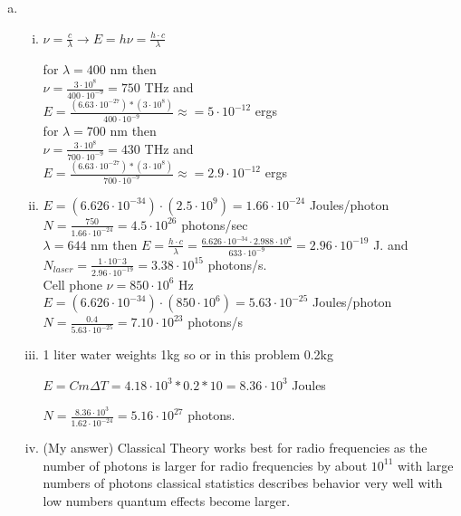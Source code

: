 \documentclass[ps1.tex]{subfiles}
\begin{document}
\noindent\makebox[\linewidth]{\rule{\paperwidth}{0.4pt}}

\begin{enumerate}[(a)]
\item \mbox{} \\ 
\noindent
\begin{enumerate}[i.]
\item $\nu=\frac {c}{\lambda} \rightarrow E = h\nu = \frac{h\cdot c}{\lambda}$

for $\lambda = 400$ nm then \\
$\nu = \frac {3\cdot 10^8}{400\cdot 10^{-9}} = 750$  THz and \\
$E=\frac{(6.63\cdot 10^{-27})*(3\cdot 10^8)}{400\cdot 10^{-9}} \approx = 5\cdot 10^{-12}$ ergs\\

for $\lambda = 700$ nm then \\
$\nu = \frac {3\cdot 10^8}{700\cdot 10^{-9}} = 430$  THz and \\
$E=\frac{(6.63\cdot 10^{-27})*(3\cdot 10^8)}{700\cdot 10^{-9}} \approx = 2.9\cdot 10^{-12}$ ergs

\item $E= (6.626\cdot 10^{-34})\cdot(2.5\cdot10^9) = 1.66\cdot 10^{-24}$ Joules/photon\\
$N = \frac{750}{1.66\cdot 10^{-24}} = 4.5\cdot10^{26}$ photons/sec\\

$\lambda = 644$ nm then $E= \frac{h\cdot c}{\lambda} = \frac {6.626\cdot10^{-34}\cdot 2.988\cdot10^8}{633\cdot10^{-9}} = 2.96\cdot10^{-19}$ J. and\\
$N_{laser} = \frac {1\cdot10^-3}{2.96\cdot10^{-19}} = 3.38\cdot10^{15}$ photons/s. \\

Cell phone $\nu = 850\cdot10^6$ Hz\\
$E= (6.626\cdot 10^{-34})\cdot(850\cdot10^6) = 5.63\cdot 10^{-25}$ Joules/photon\\
$N = \frac{0.4}{5.63\cdot 10^{-25}} = 7.10\cdot10^{23}$ photons/s\\

\item 1 liter water weights 1kg so or in this problem 0.2kg

$E = Cm \Delta T = 4.18\cdot10^3*0.2*10 = 8.36\cdot10^3$ Joules

$N = \frac {8.36\cdot10^3}{1.62\cdot10^{-24}} = 5.16\cdot10^{27}$ photons.\\

\item (My answer)
Classical Theory works best for radio frequencies as the number of photons is larger for radio frequencies by about $10^{11}$ with large numbers of photons classical statistics describes behavior very well with low numbers quantum effects become larger.


\end{enumerate}
\end{enumerate}
\end{document}
